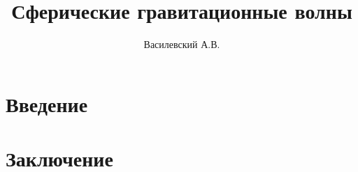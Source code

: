 \documentclass[12pt,a4paper]{article}
\title{Сферические гравитационные волны}
\author{Василевский А.В.}
\begin{document}
    \makedocroot

    \maketitle
    \tableofcontents

    \section{Введение}
    

    \section{Заключение}
    

    \begin{appendix}

    \end{appendix}
\end{document}
